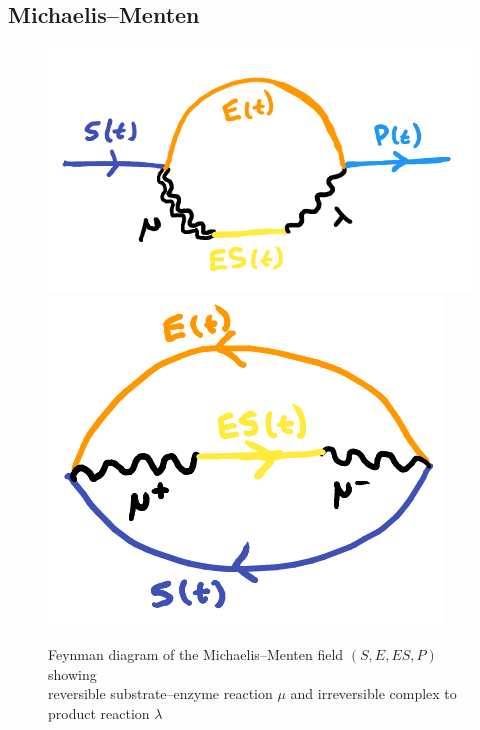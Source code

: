 \documentclass{article}[12pt]
\numberwithin{equation}{section}
\begin{document}
\subsection{Michaelis--Menten}
\begin{figure}[H]
\centering{}
\captionsetup{justification=centering}
\includegraphics[scale=0.35]{figures/michaelismentenfield}
\includegraphics[scale=0.35]{figures/reversiblefield}
\caption{Feynman diagram of the Michaelis--Menten field $(S,E,ES,P)$ showing \\
reversible substrate--enzyme reaction $\mu$ and irreversible complex to product
reaction $\lambda$}
\label{fig:michaelismentenfield}
\end{figure}


\end{document}
